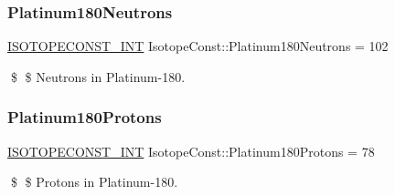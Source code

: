 \subsubsection{\texorpdfstring{Platinum180\+Neutrons}{Platinum180Neutrons}}
{\footnotesize\ttfamily \mbox{\hyperlink{group___isotope_const-_macros_ga5f18360b3e99483a35c32d789e62621c}{I\+S\+O\+T\+O\+P\+E\+C\+O\+N\+S\+T\+\_\+\+I\+NT}} Isotope\+Const\+::\+Platinum180\+Neutrons = 102}

\$ \$ Neutrons in Platinum-\/180. \mbox{\label{group___isotope_const-_platinum-_pt180_ga711913171a8064edbc1a3cc6686bf6ce}} 
\subsubsection{\texorpdfstring{Platinum180\+Protons}{Platinum180Protons}}
{\footnotesize\ttfamily \mbox{\hyperlink{group___isotope_const-_macros_ga5f18360b3e99483a35c32d789e62621c}{I\+S\+O\+T\+O\+P\+E\+C\+O\+N\+S\+T\+\_\+\+I\+NT}} Isotope\+Const\+::\+Platinum180\+Protons = 78}

\$ \$ Protons in Platinum-\/180. 